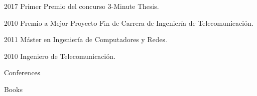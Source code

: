 \begin{otherlanguage}{spanish}
\begin{cv}{}
	\begin{cvlist}{}\label{premios}
		\item[2017] Primer Premio del concurso 3-Minute Thesis.
		\item[2010] Premio a Mejor Proyecto Fin de Carrera de Ingeniería de Telecomunicación.
	\end{cvlist}
	\begin{cvlist}{}\label{comp}
		\item[2011] Máster en Ingeniería de Computadores y Redes.
		\item[2010] Ingeniero de Telecomunicación.
	\end{cvlist}
	\begin{cvlist}{}
			\nocite{*}
			\item \printbibliography[env=nolabelbib,heading=none, title={Articles}, keyword=cv, type=article]
			
			\item{Conferences} \printbibliography[env=nolabelbib,heading=none, title={Conferences}, keyword=cv,type=inproceedings]
			
			\item{Books} \printbibliography[env=nolabelbib,heading=none,keyword=cv, title={Books}, type=inbook]
	\end{cvlist}
\end{cv}
\end{otherlanguage}
%